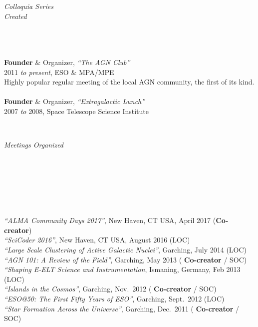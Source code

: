 \documentclass[11pt]{article}
\begin{document}
\hspace{2.5mm} \parbox{1.5in}{\textit{Colloquia Series \\ Created\\\\\\\\} } \parbox{5.15in}{
\textbf{Founder} \& Organizer, \textit{``The AGN Club''}  \\ 2011 \textit{to present},  ESO \& MPA/MPE \\ Highly popular regular meeting of the local AGN community, the first of its kind. \\\\
\textbf{Founder} \& Organizer, \textit{``Extragalactic Lunch''} \\
2007 \textit{to} 2008, Space Telescope Science Institute} \\


\vspace{4mm}



\hspace{2.5mm} \parbox{1.5in}{\textit{Meetings Organized} \\\\\\\\\\\\\\} \parbox{5.15in}{
\textit{``ALMA Community Days 2017''}, New Haven, CT USA, April 2017 (\textbf{Co-creator}) \\
\textit{``SciCoder 2016''}, New Haven, CT USA, August 2016 (LOC)\\
\textit{``Large Scale Clustering of Active Galactic Nuclei''}, Garching, July 2014 (LOC)\\
\textit{``AGN 101: A Review of the Field''}, Garching, May 2013 (\textbf{ Co-creator} / SOC)\\
\textit{``Shaping E-ELT Science and Instrumentation}, Ismaning, Germany, Feb 2013 (LOC)\\
\textit{``Islands in the Cosmos''}, Garching, Nov.~2012 (\textbf{ Co-creator} / SOC)\\
\textit{``ESO@50: The First Fifty Years of ESO''}, Garching, Sept.~2012  (LOC)\\
\textit{``Star Formation Across the Universe''}, Garching, Dec.~2011 (\textbf{ Co-creator} / SOC)
}


\vspace{4mm}
\end{document}
